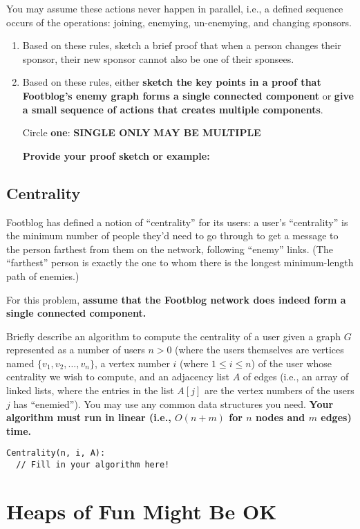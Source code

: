 \documentclass[11pt, oneside]{article}   	%
\theoremstyle{definition}
\theoremstyle{remark}
\begin{document}
You may assume these actions never happen in parallel, i.e., a defined
sequence occurs of the operations: joining, enemying, un-enemying, and
changing sponsors.
\begin{enumerate}
\item Based on these rules, sketch a brief proof that when a person
   changes their sponsor, their new sponsor cannot also be one of
   their sponsees.
\item Based on these rules, either \textbf{sketch the key points in a proof that    Footblog's enemy graph forms a single connected component} or \textbf{give    a small sequence of actions that creates multiple components}.
   
   Circle \textbf{one}: \hfill \textbf{SINGLE ONLY} \hfill \textbf{MAY BE MULTIPLE} \hfill

   \textbf{Provide your proof sketch or example:}
\end{enumerate}
\subsection{Centrality}

Footblog has defined a notion of ``centrality'' for its users: a user's
``centrality'' is the minimum number of people they'd need to go through
to get a message to the person farthest from them on the network,
following ``enemy'' links. (The ``farthest'' person is exactly the one to
whom there is the longest minimum-length path of enemies.)

For this problem, \textbf{assume that the Footblog network does indeed form a single connected component.}

Briefly describe an algorithm to compute the centrality of a user
given a graph $G$ represented as a number of users $n > 0$ (where the
users themselves are vertices named $\{v_1, v_2, \ldots, v_n\}$, a
vertex number $i$ (where $1 \leq i \leq n$) of the user whose
centrality we wish to compute, and an adjacency list $A$ of edges
(i.e., an array of linked lists, where the entries in the list $A[j]$
are the vertex numbers of the users $j$ has ``enemied''). You may use
any common data structures you need. \textbf{Your algorithm must run in linear (i.e., $O(n + m)$ for $n$ nodes and $m$ edges) time.}


\begin{verbatim}
Centrality(n, i, A):
  // Fill in your algorithm here!
\end{verbatim}
\section{Heaps of Fun Might Be OK}
\end{document}

